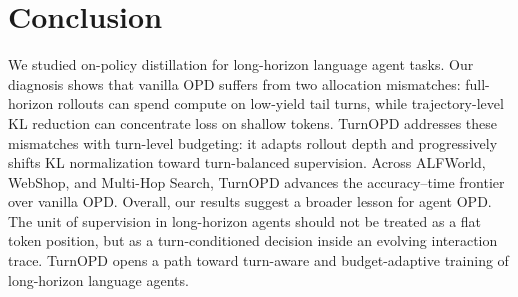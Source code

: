 \section{Conclusion}
\label{sec:limit}

We studied on-policy distillation for long-horizon language agent tasks. Our
diagnosis shows that vanilla OPD suffers from two allocation mismatches:
full-horizon rollouts can spend compute on low-yield tail turns, while
trajectory-level KL reduction can concentrate loss on shallow tokens. TurnOPD
addresses these mismatches with turn-level budgeting: it adapts rollout depth
and progressively shifts KL normalization toward turn-balanced supervision.
Across ALFWorld, WebShop, and Multi-Hop Search, TurnOPD advances the
accuracy--time frontier over vanilla OPD.
Overall, our results suggest a broader lesson for agent OPD. The unit of
supervision in long-horizon agents should not be treated as a flat token
position, but as a turn-conditioned decision inside an evolving interaction
trace. TurnOPD opens a path toward turn-aware and budget-adaptive training of
long-horizon language agents.



